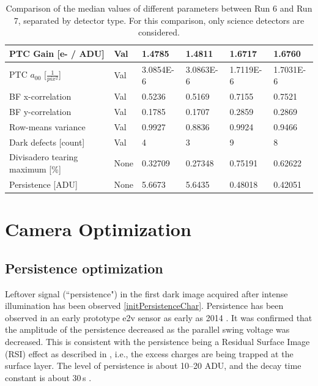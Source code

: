 \begin{table}[ht]
{\begin{tabular}{|l|l|ll|ll|}
PTC Gain {[}e- / ADU{]}            & Val               & \multicolumn{1}{l|}{1.4785}    & 1.4811    & \multicolumn{1}{l|}{1.6717}    & 1.6760     \\ \hline
PTC $a_{00}$ [$\frac{1}{pix^2}$]   & Val               & \multicolumn{1}{l|}{3.0854E-6} & 3.0863E-6 & \multicolumn{1}{l|}{1.7119E-6} & 1.7031E-6  \\ \hline
BF x-correlation                   & Val               & \multicolumn{1}{l|}{0.5236}    & 0.5169    & \multicolumn{1}{l|}{0.7155}    & 0.7521     \\ \hline
BF y-correlation                   & Val               & \multicolumn{1}{l|}{0.1785}    & 0.1707    & \multicolumn{1}{l|}{0.2859}    & 0.2869     \\ \hline
Row-means variance                 & Val               & \multicolumn{1}{l|}{0.9927}    & 0.8836    & \multicolumn{1}{l|}{0.9924}    & 0.9466     \\ \hline
Dark defects {[}count{]}           & Val               & \multicolumn{1}{l|}{4} & 3 & \multicolumn{1}{l|}{9} & 8  \\ \hline
Divisadero tearing maximum {[}\%{]}& None               & \multicolumn{1}{l|}{0.32709}   & 0.27348   & \multicolumn{1}{l|}{0.75191}   & 0.62622    \\ \hline
Persistence {[}ADU{]}              & None               & \multicolumn{1}{l|}{5.6673}    & 5.6435    & \multicolumn{1}{l|}{0.48018}   & 0.42051    \\ \hline
\end{tabular}
}
\caption{Comparison of the median values of different parameters between Run 6 and Run 7, separated by detector type. For this comparison, only science detectors are considered.}
\end{table}


\section{Camera Optimization}\label{sec:camera-optimization}

\subsection{Persistence optimization}\label{sec:persistence-optimization}


Leftover signal (``persistence") in the first dark image acquired after intense illumination has
been observed \ref{initPersistenceChar}.  Persistence has been observed
in an early prototype e2v sensor as early as 2014
\citep{2014SPIE.9154E..18D}. It was confirmed that the amplitude of
the persistence decreased as the parallel swing voltage was decreased.
This is consistent with the persistence being a Residual Surface Image (RSI) effect as described in
\citet{2001sccd.book.....J}, i.e., the excess charges are being trapped
at the surface layer. The level of persistence is about 10--20 ADU,
and the decay time constant is about 30\,s
\citep{dmtn-276}.

